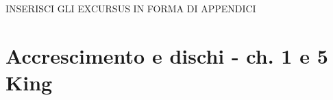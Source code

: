 
INSERISCI GLI EXCURSUS IN FORMA DI APPENDICI

\chapter{Accrescimento e dischi - ch. 1 e 5 King}

% 
% 
% 
